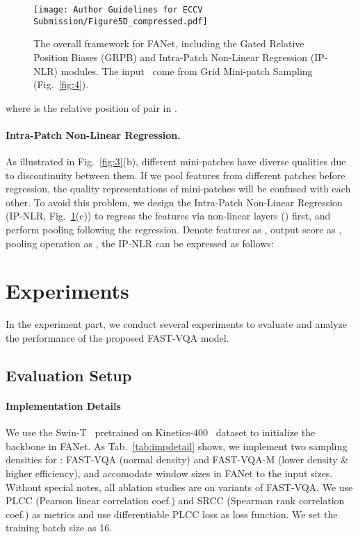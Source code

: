 \documentclass[runningheads]{llncs}
\begin{document}
\begin{figure}[]
    \centering
    \texttt{[image: Author Guidelines for ECCV Submission/Figure5D\_compressed.pdf]}
    \vspace{-10pt}
    \caption{The overall framework for FANet, including the Gated Relative Position Biases (GRPB) and Intra-Patch Non-Linear Regression (IP-NLR) modules. The input \frag~come from Grid Mini-patch Sampling (Fig.~\ref{fig:4}).}
    \label{fig:5}
    \vspace{-18pt}
\end{figure}

\vspace{-10pt}

where  is the relative position of pair  in \frag.

\paragraph{Intra-Patch Non-Linear Regression.} As illustrated in Fig.~\ref{fig:3}(b), different mini-patches have diverse qualities due to discontinuity between them. If we pool features from different patches before regression, the quality representations of mini-patches will be confused with each other. To avoid this problem, we design the Intra-Patch Non-Linear Regression (IP-NLR, Fig.~\ref{fig:5}(c)) to regress the features via non-linear layers () first, and perform pooling following the regression. Denote features as , output score as , pooling operation as , the IP-NLR can be expressed as follows:

\vspace{-10pt}


\section{Experiments}

In the experiment part, we conduct several experiments to evaluate and analyze the performance of the proposed FAST-VQA model.



\subsection{Evaluation Setup}

\paragraph{Implementation Details} We use the Swin-T~\cite{swin3d} pretrained on Kinetics-400~\cite{k400data} dataset to initialize the backbone in FANet. As Tab.~\ref{tab:impdetail} shows, we implement two sampling densities for \frag:  FAST-VQA (normal density) and FAST-VQA-M (lower density \& higher efficiency), and accomodate window sizes in FANet to the input sizes.  Without special notes, all ablation studies are on variants of FAST-VQA. We use PLCC (Pearson linear correlation coef.) and SRCC (Spearman rank correlation coef.) as metrics and use differentiable PLCC loss  as loss function. We set the training batch size as 16.
\end{document}
